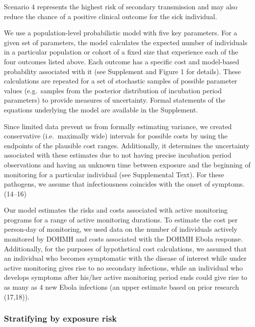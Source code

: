 \documentclass[]{article}
\begin{document}
Scenario 4 represents the highest risk of secondary transmission and may
also reduce the chance of a positive clinical outcome for the sick
individual.

We use a population-level probabilistic model with five key parameters.
For a given set of parameters, the model calculates the expected number
of individuals in a particular population or cohort of a fixed size that
experience each of the four outcomes listed above. Each outcome has a
specific cost and model-based probability associated with it (see
Supplement and Figure 1 for details). These calculations are repeated
for a set of stochastic samples of possible parameter values
(e.g.~samples from the posterior distribution of incubation period
parameters) to provide measures of uncertainty. Formal statements of the
equations underlying the model are available in the Supplement.

Since limited data prevent us from formally estimating variance, we
created conservative (i.e.~maximally wide) intervals for possible costs
by using the endpoints of the plausible cost ranges. Additionally, it
determines the uncertainty associated with these estimates due to not
having precise incubation period observations and having an unknown time
between exposure and the beginning of monitoring for a particular
individual (see Supplemental Text). For these pathogens, we assume that
infectiousness coincides with the onset of symptoms.(14--16)

Our model estimates the risks and costs associated with active
monitoring programs for a range of active monitoring durations. To
estimate the cost per person-day of monitoring, we used data on the
number of individuals actively monitored by DOHMH and costs associated
with the DOHMH Ebola response. Additionally, for the purposes of
hypothetical cost calculations, we assumed that an individual who
becomes symptomatic with the disease of interest while under active
monitoring gives rise to no secondary infections, while an individual
who develops symptoms after his/her active monitoring period ends could
give rise to as many as 4 new Ebola infections (an upper estimate based
on prior research (17,18)).

\subsubsection{Stratifying by exposure
risk}\label{stratifying-by-exposure-risk}
\end{document}
